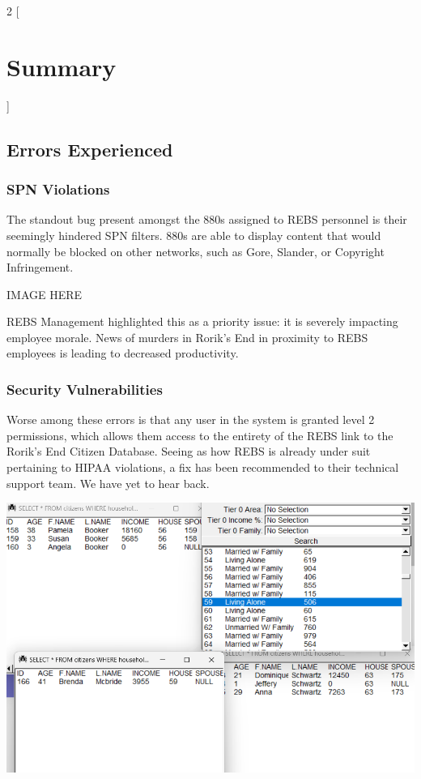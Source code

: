 \documentclass{article}
\begin{document}
\begin{multicols}{2}
[
\section{Summary}
]
\subsection{Errors Experienced}
\subsubsection{SPN Violations}
The standout bug present amongst the 880s assigned to REBS personnel is their seemingly hindered SPN filters. 880s are able to display content that would normally be blocked on other networks, such as Gore, Slander, or Copyright Infringement. 

IMAGE HERE

REBS Management highlighted this as a priority issue: it is severely impacting employee morale. News of murders in Rorik's End in proximity to REBS employees is leading to decreased productivity.

\subsubsection{Security Vulnerabilities}
Worse among these errors is that any user in the system is granted level 2 permissions, which allows them access to the entirety of the REBS link to the Rorik's End Citizen Database. Seeing as how REBS is already under suit pertaining to HIPAA violations, a fix has been recommended to their technical support team. We have yet to hear back. 

\includegraphics[scale=0.4]{database.png}


\end{multicols}
\end{document}
